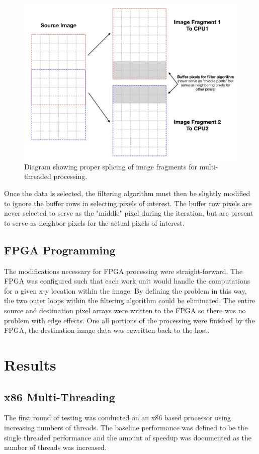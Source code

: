 \documentclass{article} %
\begin{document}
\begin{figure}[ht!]
\centering
\includegraphics[width=120mm]{buffer.png}
\caption{Diagram showing proper splicing of image fragments for multi-threaded processing.\label{overflow}}
\end{figure}

Once the data is selected, the filtering algorithm must then be slightly modified to ignore the buffer rows in selecting pixels of interest.  The buffer row pixels are never selected to serve as the "middle" pixel during the iteration, but are present to serve as neighbor pixels for the actual pixels of interest.

\subsection{FPGA Programming}
The modifications necessary for FPGA processing were straight-forward. The FPGA was configured such that each work unit would handle the computations for a given x-y location within the image.  By defining the problem in this way, the two outer loops within the filtering algorithm could be eliminated.  The entire source and destination pixel arrays were written to the FPGA so there was no problem with edge effects.  One all portions of the processing were finished by the FPGA, the destination image data was rewritten back to the host.  

\section{Results}
\subsection{x86 Multi-Threading}
The first round of testing was conducted on an x86 based processor using increasing numbers of threads. The baseline performance was defined to be the single threaded performance and the amount of speedup was documented as the number of threads was increased.
\end{document}
